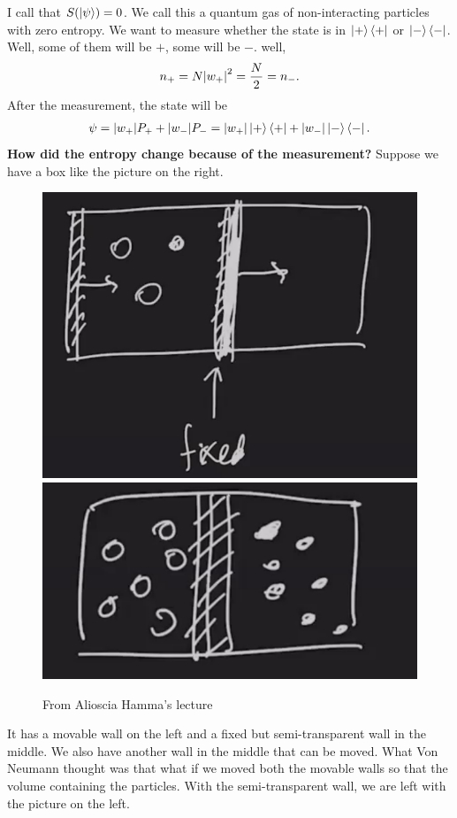 \documentclass{book}
\theoremstyle{definition}
\newcommand{\f}[2]{\frac{#1}{#2}}
\begin{document}
I call that  $ S(\ket{\psi}) = 0$. We call this a quantum gas of non-interacting particles with zero entropy. We want to measure whether the state is in $\ket{+}\bra{+}$ or $\ket{-}\bra{-}$. Well, some of them will be $+$, some will be $-$. well, 
\begin{align}
n_+ = N\abs{w_+}^2 = \f{N}{2} = n_-.
\end{align}
After the measurement, the state will be 
\begin{align}
{\psi} = \abs{w_{+}} P_+ + \abs{w_-}P_- = \abs{w_{+}}\ket{+}\bra{+} + \abs{w_-} \ket{-}\bra{-}.
\end{align}
\textbf{How did the entropy change because of the measurement?} Suppose we have a box like the picture on the right. 
\begin{figure}[!htb]
	\centering
	\includegraphics[scale=0.2]{entropy1}
	\includegraphics[scale=0.35]{entropy2}
	\caption{From Alioscia Hamma's lecture}
\end{figure}
It has a movable wall on the left and a fixed but semi-transparent wall in the middle. We also have another wall in the middle that can be moved. What Von Neumann thought was that what if we moved both the movable walls so that the volume containing the particles. With the semi-transparent wall, we are left with the picture on the left.\\
\end{document}
